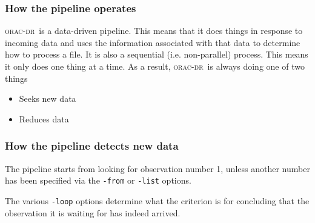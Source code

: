 \documentclass[twoside,11pt]{article}
\renewcommand{\_}{\texttt{\symbol{95}}}
\newcommand{\oracdr}{\textsc{orac-dr}}
\begin{document}
\subsubsection*{How the pipeline operates}

\oracdr\ is a data-driven pipeline. This means that it does things in
response to incoming data and uses the information associated with
that data to determine how to process a file. It is also a sequential
(i.e. non-parallel) process. This means it only does one thing at a
time. As a result, \oracdr\ is always doing one of two things

\begin{itemize}

\item
Seeks new data

\item
Reduces data

\end{itemize}

\subsubsection*{How the pipeline detects new data}

The pipeline starts from looking for observation number 1, unless
another number has been specified via the {\tt -from} or {\tt -list} options.

The various {\tt -loop} options determine what the criterion is for
concluding that the observation it is waiting for has indeed arrived.
\end{document}
